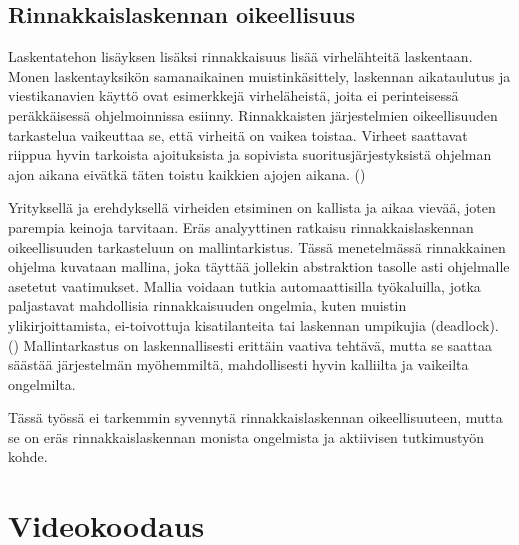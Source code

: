 \subsection{Rinnakkaislaskennan oikeellisuus}
\label{sec:model}

Laskentatehon lisäyksen lisäksi rinnakkaisuus lisää virhelähteitä laskentaan.
Monen laskentayksikön samanaikainen muistinkäsittely, laskennan aikataulutus ja viestikanavien käyttö ovat
esimerkkejä virheläheistä, joita ei perinteisessä peräkkäisessä ohjelmoinnissa
esiinny. Rinnakkaisten järjestelmien oikeellisuuden tarkastelua vaikeuttaa se,
että virheitä on vaikea toistaa. Virheet saattavat riippua hyvin tarkoista
ajoituksista ja sopivista suoritusjärjestyksistä ohjelman ajon aikana eivätkä
täten toistu kaikkien ajojen aikana. (\citealt{ari})

Yrityksellä ja erehdyksellä virheiden etsiminen on kallista ja aikaa vievää,
joten parempia keinoja tarvitaan. Eräs analyyttinen ratkaisu
rinnakkaislaskennan oikeellisuuden tarkasteluun on mallintarkistus. Tässä
menetelmässä rinnakkainen ohjelma kuvataan mallina, joka täyttää jollekin
abstraktion tasolle asti ohjelmalle asetetut vaatimukset. Mallia voidaan
tutkia automaattisilla työkaluilla, jotka paljastavat mahdollisia
rinnakkaisuuden ongelmia, kuten muistin ylikirjoittamista, ei-toivottuja
kisatilanteita tai laskennan umpikujia (deadlock). (\citealt{ari})
Mallintarkastus on laskennallisesti erittäin vaativa tehtävä, mutta se saattaa
säästää järjestelmän myöhemmiltä, mahdollisesti hyvin kalliilta ja vaikeilta
ongelmilta.

Tässä työssä ei tarkemmin syvennytä rinnakkaislaskennan oikeellisuuteen, mutta
se on eräs rinnakkaislaskennan monista ongelmista ja aktiivisen tutkimustyön kohde.

\section{Videokoodaus}
\label{chap:coding}

